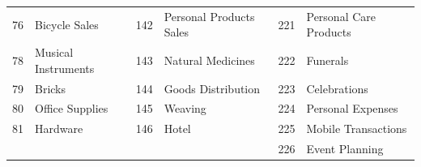 \begin{longtable}[]{|r|l|r|l|r|l|}
	76                                & Bicycle Sales                      & 142                               & Personal Products Sales            & 221                               & Personal Care
	Products                                                                                                                                                                                                                 \\
	78                                & Musical Instruments                & 143                               & Natural Medicines                  & 222                               & Funerals                           \\
	79                                & Bricks                             & 144                               & Goods Distribution                 & 223                               & Celebrations                       \\
	80                                & Office Supplies                    & 145                               & Weaving                            & 224                               & Personal Expenses                  \\
	81                                & Hardware                           & 146                               & Hotel                              & 225                               & Mobile Transactions                \\
	                                  &                                    &                                   &                                    & 226                               & Event Planning                     \\
\end{longtable}


